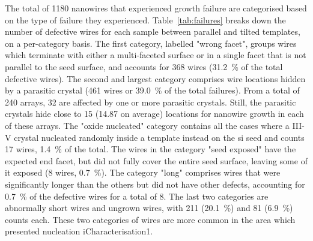 The total of \num{1180} nanowires that experienced growth failure are categorised based on the type of failure they experienced. Table~\ref{tab:failures} breaks down the number of defective wires for each sample between parallel and tilted templates, on a per-category basis. The first category, labelled "wrong facet", groups wires which terminate with either a multi-faceted surface or in a single facet that is not parallel to the seed surface, and accounts for \num{368} wires (\qty{31.2}{\%} of the total defective wires). The second and largest category comprises wire locations hidden by a parasitic crystal (\num{461} wires or \qty{39.0}{\%} of the total failures). From a total of \num{240} arrays, \num{32} are affected by one or more parasitic crystals. Still, the parasitic crystals hide close to \num{15} (\num{14.87} on average) locations for nanowire growth in each of these arrays. The "oxide nucleated" category contains all the cases where a III-V crystal nucleated randomly inside a template instead on the \acs{si} seed and counts \num{17} wires, \qty{1.4}{\%} of the total. The wires in the category "seed exposed" have the expected end facet, but did not fully cover the entire seed surface, leaving some of it exposed (\num{8} wires, \qty{0.7}{\%}). The category "long" comprises wires that were significantly longer than the others but did not have other defects, accounting for \qty{0.7}{\%} of the defective wires for a total of \num{8}. The last two categories are abnormally short wires and ungrown wires, with \num{211} (\qty{20.1}{\%}) and \num{81} (\qty{6.9}{\%}) counts each. These two categories of wires are more common in the area which presented nucleation iCharacterisation1.